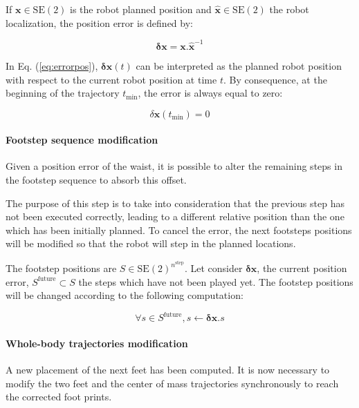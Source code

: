 If $\mathbf{x} \in \text{SE}(2)$ is the robot planned position and
$\hat{\mathbf{x}} \in \text{SE}(2)$ the robot localization, the
position error is defined by:

\begin{equation} \label{eq:errorpos}
  \mathbf{\delta x} = \mathbf{x} . \hat{\mathbf{x}}^{-1}
\end{equation}

In Eq. (\ref{eq:errorpos}), $\mathbf{\delta x}(t)$ can be
interpreted as the planned robot position with respect to the current
robot position at time $t$. By consequence, at the beginning of the
trajectory $t_{\text{min}}$, the error is always equal to zero:

\begin{equation} \label{eq:errorpos_prop}
  \delta \mathbf{x}(t_{\text{min}}) = 0
\end{equation}

\paragraph{Footstep sequence modification}


Given a position error of the waist, it is possible to alter the
remaining steps in the footstep sequence to absorb this offset.

The purpose of this step is to take into consideration that the
previous step has not been executed correctly, leading to a different
relative position than the one which has been initially planned. To
cancel the error, the next footsteps positions will be modified
so that the robot will step in the planned locations.


The footstep positions are \mbox{$S \in
  \text{SE}(2)^{n^\text{step}}$}. Let consider $\mathbf{\delta {x}}$,
the current position error, \mbox{$S^{\text{future}} \subset S$} the
steps which have not been played yet. The footstep positions will be
changed according to the following computation:

\begin{equation} \label{eq:footstepmodif}
  \forall s \in S^{\text{future}}, s \gets \mathbf{\delta {x}} . s
\end{equation}


\paragraph{Whole-body trajectories modification}

A new placement of the next feet has been computed. It is now necessary
to modify the two feet and the center of mass trajectories
synchronously to reach the corrected foot prints.

